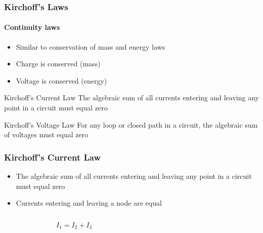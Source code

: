 \documentclass[svgnames,x11names]{beamer}
\begin{document}
\begin{frame}
  \frametitle{Kirchoff's Laws}
  \framesubtitle{Continuity laws}
  \begin{itemize}
  \item Similar to conservation of mass and energy laws
  \item Charge is conserved (mass)
  \item Voltage is conserved (energy)
  \end{itemize}
  \begin{block}{Kirchoff’s Current Law}
    The algebraic sum of all currents entering and
leaving any point in a circuit must equal zero
  \end{block}
  \begin{block}{Kirchoff’s Voltage Law}
    For any loop or closed path in a circuit, the algebraic sum 
    of voltages must equal zero
  \end{block}
\end{frame}

\begin{frame}
  \frametitle{Kirchoff’s Current Law}
  \begin{itemize}
  \item The algebraic sum of all currents entering and leaving any
    point in a circuit must equal zero
  \item Currents entering and leaving a node are equal
  \end{itemize}
  \begin{columns}[onlytextwidth]
    \begin{column}{0.5\textwidth}
  \[ I_1 = I_2 + I_3 \]
\end{column}
    \begin{column}{0.5\textwidth}
\end{column}
\end{columns}
\end{frame}
\end{document}
